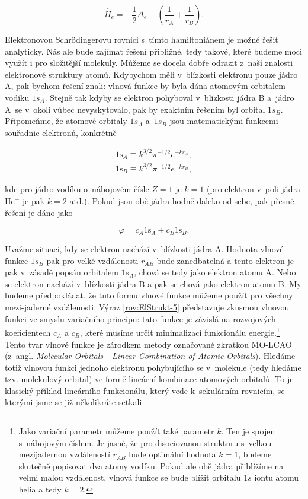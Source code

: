 \begin{equation}
\hat{H}_e = -\frac{1}{2}\Delta_e - \left( \frac{1}{r_A} + \frac{1}{r_B} \right).
\label{rov:ElStrukt-3}
\end{equation}

Elektronovou Schr\"odingerovu rovnici s~tímto hamiltoniánem je možné řešit analyticky. Nás ale bude zajímat řešení přibližné, tedy takové, které budeme moci využít i pro složitější molekuly. Můžeme se docela dobře odrazit z~naší znalosti elektronové struktury atomů. Kdybychom měli v~blízkosti elektronu pouze jádro A, pak bychom řešení znali: vlnová funkce by byla dána atomovým orbitalem vodíku $1s_A$. Stejně tak kdyby se elektron pohyboval v~blízkosti jádra B a~jádro A~se v~okolí vůbec nevyskytovalo, pak by exaktním řešením byl orbital $1s_B$. Připomeňme, že atomové orbitaly $1s_A$ a~$1s_B$ jsou matematickými funkcemi souřadnic elektronů, konkrétně

\begin{eqnarray}
1\mathrm{s}_A \equiv k^{3/2} \pi^{-1/2} e^{-k r_A}, \nonumber \\
1\mathrm{s}_B \equiv k^{3/2} \pi^{-1/2} e^{-k r_B}, 
\label{rov:ElStrukt-4}
\end{eqnarray}

\noindent kde pro jádro vodíku o~nábojovém čísle $Z=1$ je $k=1$ (pro elektron v~poli jádra He$^+$ je pak $k=2$ atd.). Pokud jsou obě jádra hodně daleko od sebe, pak přesné řešení je dáno jako

\begin{equation}
\varphi = c_A 1 \mathrm{s}_A + c_B 1\mathrm{s}_B.
\label{rov:ElStrukt-5}
\end{equation}

Uvažme situaci, kdy se elektron nachází v~blízkosti jádra A. Hodnota vlnové funkce $1s_B$ pak pro velké vzdálenosti $r_{AB}$ bude zanedbatelná a tento elektron je pak v~zásadě popsán orbitalem $1s_A$, chová se tedy jako elektron atomu A. Nebo se elektron nachází v~blízkosti jádra B a pak se chová jako elektron atomu B. My budeme předpokládat, že tuto formu vlnové funkce můžeme použít pro všechny mezi-jaderné vzdálenosti. Výraz \eqref{rov:ElStrukt-5} představuje zkusmou vlnovou funkci ve smyslu variačního principu: tato funkce je závislá na rozvojových koeficientech $c_A$ a $c_B$, které musíme určit minimalizací funkcionálu energie.\footnote{Jako variační parametr můžeme použít také parametr $k$. Ten je spojen s~nábojovým číslem. Je jasné, že pro disociovanou strukturu s~velkou mezijadernou vzdáleností $r_{AB}$ bude optimální hodnota $k=1$, budeme skutečně popisovat dva atomy vodíku. Pokud ale obě jádra přiblížíme na velmi malou vzdálenost, vlnová funkce se bude blížit orbitalu $1s$ iontu atomu helia a tedy $k=2$.} Tento tvar vlnové funkce je zárodkem metody označované zkratkou MO-LCAO (z~angl. \textit{Molecular Orbitals - Linear Combination of Atomic Orbitals}). Hledáme totiž vlnovou funkci jednoho elektronu pohybujícího se v~molekule (tedy hledáme tzv. molekulový orbital) ve formě lineární kombinace atomových orbitalů. To je klasický příklad lineárního funkcionálu, který vede k~sekulárním rovnicím, se kterými jsme se již několikráte setkali

